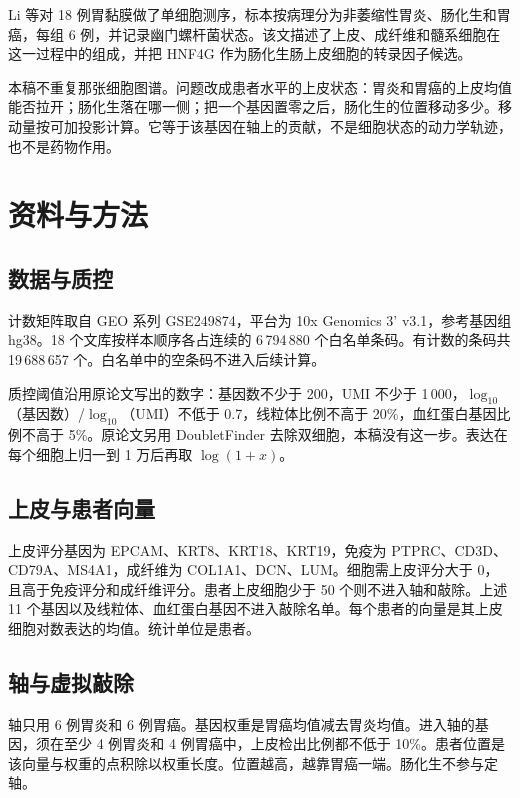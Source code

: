 \documentclass[12pt,a4paper,fontset=none]{ctexart}
\begin{document}
Li 等对 18 例胃黏膜做了单细胞测序，标本按病理分为非萎缩性胃炎、肠化生和胃癌，每组 6 例，并记录幽门螺杆菌状态\cite{li2025}。该文描述了上皮、成纤维和髓系细胞在这一过程中的组成，并把 HNF4G 作为肠化生肠上皮细胞的转录因子候选。

本稿不重复那张细胞图谱。问题改成患者水平的上皮状态：胃炎和胃癌的上皮均值能否拉开；肠化生落在哪一侧；把一个基因置零之后，肠化生的位置移动多少。移动量按可加投影计算。它等于该基因在轴上的贡献，不是细胞状态的动力学轨迹，也不是药物作用。

\section{资料与方法}

\subsection{数据与质控}

计数矩阵取自 GEO 系列 GSE249874，平台为 10x Genomics 3' v3.1，参考基因组 hg38\cite{li2025}。18 个文库按样本顺序各占连续的 6\,794\,880 个白名单条码。有计数的条码共 19\,688\,657 个。白名单中的空条码不进入后续计算。

质控阈值沿用原论文写出的数字：基因数不少于 200，UMI 不少于 1\,000，\(\log_{10}\)（基因数）/\(\log_{10}\)（UMI）不低于 0.7，线粒体比例不高于 20\%，血红蛋白基因比例不高于 5\%。原论文另用 DoubletFinder 去除双细胞，本稿没有这一步。表达在每个细胞上归一到 1 万后再取 \(\log(1+x)\)。

\subsection{上皮与患者向量}

上皮评分基因为 EPCAM、KRT8、KRT18、KRT19，免疫为 PTPRC、CD3D、CD79A、MS4A1，成纤维为 COL1A1、DCN、LUM。细胞需上皮评分大于 0，且高于免疫评分和成纤维评分。患者上皮细胞少于 50 个则不进入轴和敲除。上述 11 个基因以及线粒体、血红蛋白基因不进入敲除名单。每个患者的向量是其上皮细胞对数表达的均值。统计单位是患者。

\subsection{轴与虚拟敲除}

轴只用 6 例胃炎和 6 例胃癌。基因权重是胃癌均值减去胃炎均值。进入轴的基因，须在至少 4 例胃炎和 4 例胃癌中，上皮检出比例都不低于 10\%。患者位置是该向量与权重的点积除以权重长度。位置越高，越靠胃癌一端。肠化生不参与定轴。
\end{document}
